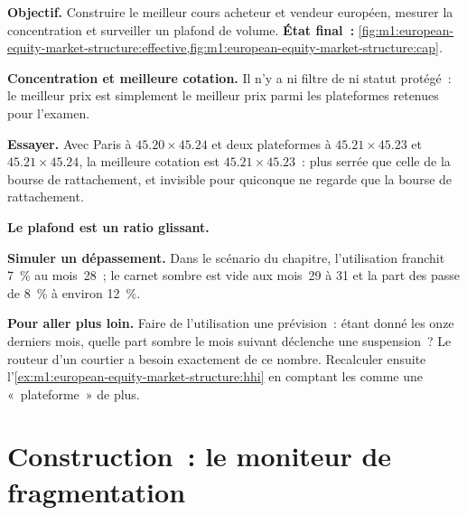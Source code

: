 \begin{tutorial}
\textbf{Objectif.} Construire le meilleur cours acheteur et vendeur européen, mesurer la
concentration et surveiller un plafond de volume. \textbf{État final~:}
\cref{fig:m1:european-equity-market-structure:effective,fig:m1:european-equity-market-structure:cap}.
\begin{tutsteps}
\item \textbf{Concentration et meilleure cotation.} Il n'y a ni filtre de 
ni statut protégé~: le meilleur prix est simplement le meilleur prix parmi les
plateformes retenues pour l'examen.
\label{lst:m1:european-equity-market-structure:hhi}
\item \textbf{Essayer.} Avec Paris à $45.20 \times 45.24$ et deux plateformes
à $45.21 \times 45.23$ et $45.21 \times 45.24$, la meilleure cotation est $45.21
\times 45.23$~: plus serrée que celle de la bourse de rattachement, et invisible pour
quiconque ne regarde que la bourse de rattachement.
\item \textbf{Le plafond est un ratio glissant.}
\label{lst:m1:european-equity-market-structure:cap}
\item \textbf{Simuler un dépassement.} Dans le scénario du chapitre, l'utilisation franchit
7~\% au mois~28~; le carnet sombre est vide aux mois~29 à 31 et la part des  passe de 8~\% à environ 12~\%.
\end{tutsteps}
\textbf{Pour aller plus loin.} Faire de l'utilisation une prévision~: étant donné les onze
derniers mois, quelle part sombre le mois suivant déclenche une suspension~? Le routeur d'un
courtier a besoin exactement de ce nombre. Recalculer ensuite
l'\cref{ex:m1:european-equity-market-structure:hhi} en comptant les  comme une «~plateforme~» de plus.
\end{tutorial}

\section{Construction~: le moniteur de fragmentation}\label{bld:m1:european-equity-market-structure:monitor}

